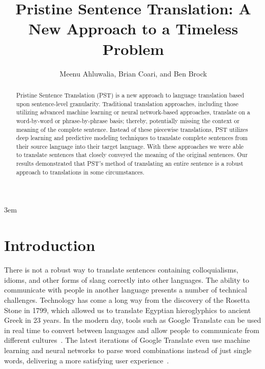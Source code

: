 \documentclass[runningheads]{llncs}
\title{Pristine Sentence Translation: A New Approach to a Timeless Problem}
\author{
	Meenu Ahluwalia, Brian Coari, and Ben Brock
}
\institute{Master of Science in Data Science \\ Southern Methodist University \\ Dallas, Texas USA \\
	\email{\{mahluwalia, bcoari, bbrock\}@smu.edu}}
\begin{document}
	\emergencystretch 3em
	\maketitle
	
	\begin{abstract}

Pristine Sentence Translation (PST) is a new approach to language translation based upon sentence-level granularity. Traditional translation approaches, including those utilizing advanced machine learning or neural network-based approaches, translate on a word-by-word or phrase-by-phrase basis; thereby, potentially missing the context or meaning of the complete sentence. Instead of these piecewise translations, PST utilizes deep learning and predictive modeling techniques to translate complete sentences from their source language into their target language. With these approaches we were able to translate sentences that closely conveyed the meaning of the original sentences. Our results demonstrated that PST's method of translating an entire sentence is a robust approach to translations in some circumstances.
		
	\end{abstract}
	
	
	\section{Introduction}
	
	There is not a robust way to translate sentences containing colloquialisms, idioms, and other forms of slang correctly into other languages. The ability to communicate with people in another language presents a number of technical challenges. Technology has come a long way from the discovery of the Rosetta Stone in 1799, which allowed us to translate Egyptian hieroglyphics to ancient Greek in 23 years. In the modern day, tools such as Google Translate can be used in real time to convert between languages and allow people to communicate from different cultures~\cite{ref_url1}. The latest iterations of Google Translate even use machine learning and neural networks to parse word combinations instead of just single words, delivering a more satisfying user experience~\cite{ref_url2}.
	
\end{document}
